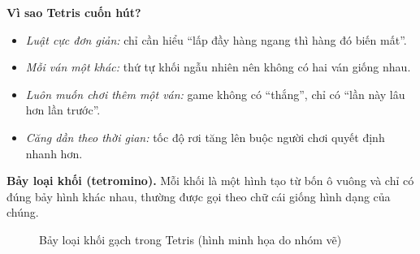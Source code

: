 \documentclass[13pt,a4paper]{extarticle}
\newcommand{\tetro}[3]{\foreach \x/\y in {#1}{%
  \fill[#2,draw=black!55,line width=0.3pt] (\x*#3,\y*#3) rectangle ++(#3,#3);}}
\begin{document}
\textbf{Vì sao Tetris cuốn hút?}
\begin{itemize}
  \item \emph{Luật cực đơn giản:} chỉ cần hiểu ``lấp đầy hàng ngang thì hàng đó biến mất''.
  \item \emph{Mỗi ván một khác:} thứ tự khối ngẫu nhiên nên không có hai ván giống nhau.
  \item \emph{Luôn muốn chơi thêm một ván:} game không có ``thắng'', chỉ có ``lần này lâu hơn lần trước''.
  \item \emph{Căng dần theo thời gian:} tốc độ rơi tăng lên buộc người chơi quyết định nhanh hơn.
\end{itemize}

\textbf{Bảy loại khối (tetromino).} Mỗi khối là một hình tạo từ bốn ô vuông và chỉ có đúng bảy hình khác nhau, thường được gọi theo chữ cái giống hình dạng của chúng.

\begin{figure}[H]
\centering
{}
\caption{Bảy loại khối gạch trong Tetris (hình minh họa do nhóm vẽ)}
\end{figure}
\end{document}

